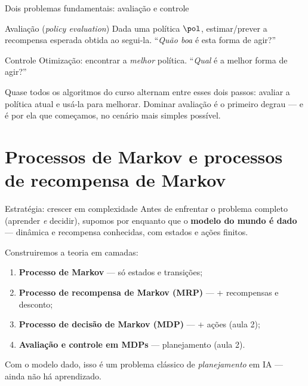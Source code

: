 \documentclass[aspectratio=169, 11pt]{beamer}
\begin{document}
\begin{frame}{Dois problemas fundamentais: avaliação e controle}
  \begin{defbox}{Avaliação (\emph{policy evaluation})}
    Dada uma política $\pol$, estimar/prever a recompensa esperada obtida
    ao segui-la. ``\emph{Quão boa} é esta forma de agir?''
  \end{defbox}

  \begin{defbox}{Controle}
    Otimização: encontrar a \emph{melhor} política.
    ``\emph{Qual} é a melhor forma de agir?''
  \end{defbox}

  \begin{ideiabox}
    Quase todos os algoritmos do curso alternam entre esses dois passos:
    avaliar a política atual e usá-la para melhorar. Dominar avaliação é o
    primeiro degrau — e é por ela que começamos, no cenário mais simples
    possível.
  \end{ideiabox}
\end{frame}

\section{Processos de Markov e processos de recompensa de Markov}

\begin{frame}{Estratégia: crescer em complexidade}
  Antes de enfrentar o problema completo (aprender \emph{e} decidir),
  supomos por enquanto que o \textbf{modelo do mundo é dado} — dinâmica e
  recompensa conhecidas, com estados e ações finitos.

  \medskip
  Construiremos a teoria em camadas:
  \begin{enumerate}
    \item \textbf{Processo de Markov} — só estados e transições;
    \item \textbf{Processo de recompensa de Markov (MRP)} — + recompensas
          e desconto;
    \item \textbf{Processo de decisão de Markov (MDP)} — + ações
          (aula 2);
    \item \textbf{Avaliação e controle em MDPs} — planejamento (aula 2).
  \end{enumerate}

  \medskip
  {\small\color{rlCinza} Com o modelo dado, isso é um problema clássico de
  \emph{planejamento} em IA — ainda não há aprendizado.}
\end{frame}
\end{document}
